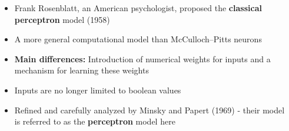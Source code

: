 \begin{frame}
	\begin{columns}
		\begin{overlayarea}{\textwidth}{\textheight}
			\begin{center}
			\end{center}
		\end{overlayarea}

		\begin{overlayarea}{\textwidth}{\textheight}
			\begin{itemize}\justifying
				\item<1-> Frank Rosenblatt, an American psychologist, proposed the \textbf{classical perceptron} model (1958)
				\item<3-> A more general computational model than McCulloch–Pitts neurons
				\item<4-> \textbf{Main differences:} Introduction of numerical weights for inputs and a mechanism for learning these weights
				\item<5-> Inputs are no longer limited to boolean values
				\item<6-> Refined and carefully analyzed by Minsky and Papert (1969) - their model is referred to as the \textbf{perceptron} model here
			\end{itemize}
		\end{overlayarea}
	\end{columns}
\end{frame}



